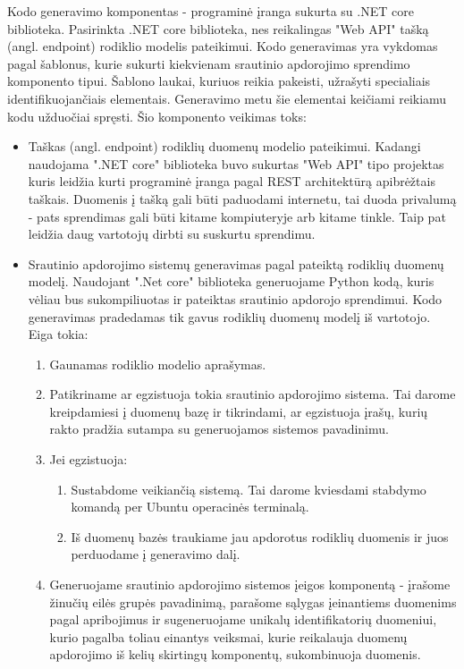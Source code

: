 \documentclass{VUMIFPSbakalaurinis}
\begin{document}
Kodo generavimo komponentas - programinė įranga sukurta su .NET core biblioteka. Pasirinkta .NET core biblioteka, nes reikalingas "Web API" tašką (angl. endpoint) rodiklio modelis pateikimui. 
Kodo generavimas yra vykdomas pagal šablonus, kurie sukurti kiekvienam srautinio apdorojimo sprendimo komponento tipui. Šablono laukai, kuriuos reikia pakeisti, užrašyti specialiais identifikuojančiais elementais. Generavimo metu šie elementai keičiami reikiamu kodu užduočiai spręsti.
Šio komponento veikimas toks:
\begin{itemize}
    \item Taškas (angl. endpoint) rodiklių duomenų modelio pateikimui. Kadangi naudojama ".NET core" biblioteka buvo sukurtas "Web API" tipo projektas kuris leidžia kurti programinė įranga pagal REST architektūrą apibrėžtais taškais. Duomenis į tašką gali būti paduodami internetu, tai duoda privalumą - pats sprendimas gali būti kitame kompiuteryje arb kitame tinkle. Taip pat leidžia daug vartotojų dirbti su suskurtu sprendimu.
    \item Srautinio apdorojimo sistemų generavimas pagal pateiktą rodiklių duomenų modelį. Naudojant ".Net core" biblioteka generuojame Python kodą, kuris vėliau bus sukompiliuotas ir pateiktas srautinio apdorojo sprendimui. Kodo generavimas pradedamas tik gavus rodiklių duomenų modelį iš vartotojo. Eiga tokia:
    \begin{enumerate}
        \item Gaunamas rodiklio modelio aprašymas.
        \item Patikriname ar egzistuoja tokia srautinio apdorojimo sistema. Tai darome kreipdamiesi į duomenų bazę ir tikrindami, ar egzistuoja įrašų, kurių rakto pradžia sutampa su generuojamos sistemos pavadinimu.
        \item Jei egzistuoja:
            \begin{enumerate}
                \item Sustabdome veikiančią sistemą. Tai darome kviesdami stabdymo komandą per Ubuntu operacinės terminalą.
                \item Iš duomenų bazės traukiame jau apdorotus rodiklių duomenis ir juos perduodame į generavimo dalį.
            \end{enumerate} 
        \item Generuojame srautinio apdorojimo sistemos įeigos komponentą - įrašome žinučių eilės grupės pavadinimą, parašome sąlygas įeinantiems duomenims pagal apribojimus ir sugeneruojame unikalų identifikatorių duomeniui, kurio pagalba toliau einantys veiksmai, kurie reikalauja duomenų apdorojimo iš kelių skirtingų komponentų, sukombinuoja duomenis.

\end{enumerate}
\end{itemize}
\end{document}
